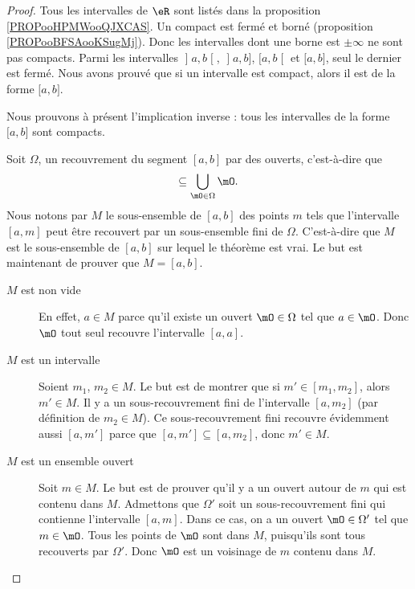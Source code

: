 \begin{proof}
	Tous les intervalles de \( \eR\) sont listés dans la proposition \ref{PROPooHPMWooQJXCAS}. Un compact est fermé et borné (proposition \ref{PROPooBFSAooKSugMj}). Donc les intervalles dont une borne est \( \pm\infty\) ne sont pas compacts. Parmi les intervalles \( \mathopen] a , b \mathclose[\), \( \mathopen] a , b \mathclose]\), \( \mathopen[ a , b \mathclose[\) et \( \mathopen[ a , b \mathclose]\), seul le dernier est fermé. Nous avons prouvé que si un intervalle est compact, alors il est de la forme \( \mathopen[ a , b \mathclose]\).

	Nous prouvons à présent l'implication inverse : tous les intervalles de la forme \( \mathopen[ a , b \mathclose]\) sont compacts.

	Soit \( \Omega\), un recouvrement du segment \( [a,b]\) par des ouverts, c'est-à-dire que
	\begin{equation}
		[a,b]\subseteq\bigcup_{\mO\in\Omega}\mO.
	\end{equation}
	Nous notons par \( M\) le sous-ensemble de \( [a,b]\) des points \( m\) tels que l'intervalle \( [a,m]\) peut être recouvert par un sous-ensemble fini de \( \Omega\). C'est-à-dire que \( M\) est le sous-ensemble de \( [a,b]\) sur lequel le théorème est vrai. Le but est maintenant de prouver que \( M=[a,b]\).
	\begin{description}
		\item[\( M\) est non vide] En effet, \( a\in M\) parce qu'il existe un ouvert \( \mO\in\Omega\) tel que \( a\in\mO\). Donc \( \mO\) tout seul recouvre l'intervalle \( [a,a]\).
		\item[\( M\) est un intervalle] Soient \( m_1\), \( m_2\in M\). Le but est de montrer que si \( m'\in[m_1,m_2]\), alors \( m'\in M\). Il y a un sous-recouvrement fini de l'intervalle \( [a,m_2]\) (par définition de \( m_2\in M\)). Ce sous-recouvrement fini recouvre évidemment aussi \( [a,m']\) parce que \( [a,m']\subseteq [a,m_2]\), donc \( m'\in M\).
		\item[\( M\) est un ensemble ouvert] Soit \( m\in M\). Le but est de prouver qu'il y a un ouvert autour de \( m\) qui est contenu dans \( M\). Admettons que \( \Omega'\) soit un sous-recouvrement fini qui contienne l'intervalle \( [a,m]\). Dans ce cas, on a un ouvert \( \mO\in\Omega'\) tel que \( m\in\mO\). Tous les points de \( \mO\) sont dans \( M\), puisqu'ils sont tous recouverts par \( \Omega'\). Donc \( \mO\) est un voisinage de \( m\) contenu dans \( M\).

\end{description}
\end{proof}
